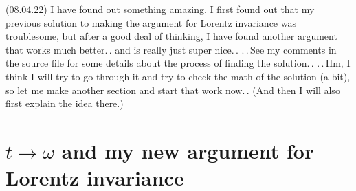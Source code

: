 \documentclass{report}
\begin{document}
(08.04.22) I have found out something amazing. I first found out that my previous solution to making the argument for Lorentz invariance was troublesome, but after a good deal of thinking, I have found another argument that works much better.\,. and is really just super nice.\,. .\,.\,See my comments in the source file for some details about the process of finding the solution.\,. .\,.\,Hm, I think I will try to go through it and try to check the math of the solution (a bit), so let me make another section and start that work now.\,. (And then I will also first explain the idea there.)


\section{$t\to\omega$ and my new argument for Lorentz invariance}
\end{document}
